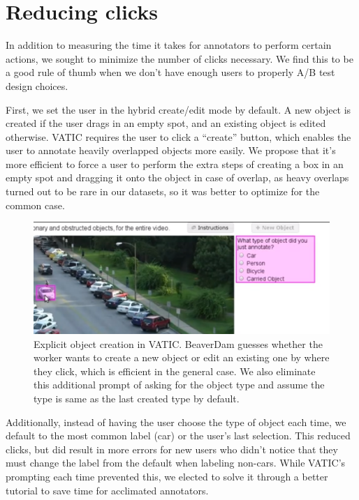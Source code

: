 \section{Reducing clicks}

In addition to measuring the time it takes for annotators to perform certain actions, we sought to minimize the number of clicks necessary.
We find this to be a good rule of thumb when we don't have enough users to properly A/B test design choices.

First, we set the user in the hybrid create/edit mode by default.
A new object is created if the user drags in an empty spot, and an existing object is edited otherwise.
VATIC requires the user to click a ``create'' button, which enables the user to annotate heavily overlapped objects more easily.
We propose that it's more efficient to force a user to perform the extra steps of creating a box in an empty spot and dragging it onto the object in case of overlap,
as heavy overlaps turned out to be rare in our datasets, so it was better to optimize for the common case.

\begin{figure}[h]
\includegraphics[width=14cm]{figs/vatic_create.png}
\centering
\caption{Explicit object creation in VATIC. BeaverDam guesses whether the worker wants to create a new object or edit an existing one by where they click, which is efficient in the general case. We also eliminate this additional prompt of asking for the object type and assume the type is same as the last created type by default.}
\end{figure}

Additionally, instead of having the user choose the type of object each time, we default to the most common label (car) or the user's last selection.
This reduced clicks, but did result in more errors for new users who didn't notice that they must change the label from the default when labeling non-cars.
While VATIC's prompting each time prevented this, we elected to solve it through a better tutorial to save time for acclimated annotators.

